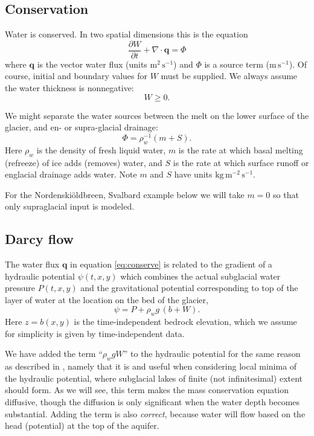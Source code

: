 \documentclass[11pt,final]{amsart}%
\newcommand\bq{\mathbf{q}}
\newcommand{\Div}{\nabla\cdot}
\begin{document}
\subsection*{Conservation}  Water is conserved.  In two spatial dimensions this is the equation \citep{Clarke05}
\begin{equation} \label{eq:conserve}
\frac{\partial W}{\partial t} + \Div \bq = \Phi
\end{equation}
where $\bq$ is the vector water flux (units $\text{m}^2\,\text{s}^{-1}$) and $\Phi$ is a source term ($\text{m}\,\text{s}^{-1}$).  Of course, initial and boundary values for $W$ must be supplied.  We always assume the water thickness is nonnegative:
\begin{equation}
W \ge 0.
\end{equation}

We might separate the water sources between the melt on the lower surface of the glacier, and en- or supra-glacial drainage:
  $$\Phi = \rho_w^{-1} \left(m + S\right).$$
Here $\rho_w$ is the density of fresh liquid water, $m$ is the rate at which basal melting (refreeze) of ice adds (removes) water, and $S$ is the rate at which surface runoff or englacial drainage adds water.  Note $m$ and $S$ have units $\text{kg}\,\text{m}^{-2}\,\text{s}^{-1}$.

\newcommand{\Nbreen}{Nordenski\"oldbreen\xspace}
For the \Nbreen, Svalbard example below we will take $m=0$ so that only supraglacial input is modeled.

\subsection*{Darcy flow}  The water flux $\bq$ in equation \eqref{eq:conserve} is related to the gradient of a hydraulic potential $\psi(t,x,y)$ which combines the actual subglacial water pressure $P(t,x,y)$ and the gravitational potential corresponding to top of the layer of water at the location on the bed of the glacier,
\begin{equation} \label{eq:potential}
\psi = P + \rho_w g\, (b+W).
\end{equation}
Here $z=b(x,y)$ is the time-independent bedrock elevation, which we assume for simplicity is given by time-independent data.

We have added the term ``$\rho_w g W$'' to the hydraulic potential for the same reason as described in \cite{Hewittetal2012}, namely that it is and useful when considering local minima of the hydraulic potential, where subglacial lakes of finite (not infinitesimal) extent should form.  As we will see, this term makes the mass conservation equation diffusive, though the diffusion is only significant when the water depth becomes substantial.  Adding the term is also \emph{correct}, because water will flow based on the head (potential) at the top of the aquifer.
\end{document}
